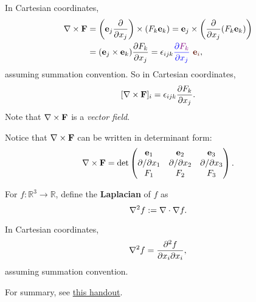 \begin{note}
    In Cartesian coordinates, 
    \begin{align*}
        \curl \bfF&= \left( \mathbf{e}_j \frac{\partial }{\partial x_j} \right)\times (F_k\bfe_k)=\bfe_j \times \left( \frac{\partial }{\partial x_j}(F_k\bfe_k)  \right)\\ 
        &= (\mathbf{e}_j \times \mathbf{e}_k)\frac{\partial F_k}{\partial x_j} = \epsilon_{ijk} {\color{blue}\frac{\partial {\color{violet}F_k}}{\partial x_j}} \ {\color{Sepia}\bfe_i},
    \end{align*}
    assuming summation convention. So in Cartesian coordinates,
    \[
        [\nabla\times {\bf F}]_{i} = \epsilon_{ijk}\frac{\partial F_k}{\partial x_j}. 
    \]
    Note that $ \nabla\times {\bf F} $ is a \textit{vector field}.
\end{note}
Notice that $ \nabla\times {\bf F} $ can be written in determinant form:
\[
    \nabla\times {\bf F} = \det \begin{pmatrix}
        {\bf e}_1 & {\bf e}_2 & {\bf e}_3 \\
        \partial /\partial x_1  & \partial /\partial x_2  & \partial /\partial x_3  \\
        F_1 & F_2 & F_3 \\
    \end{pmatrix}.
\]

\begin{definition}[Laplacian]
    For $ f:\mathbb{R}^{3}\to \mathbb{R} $, define the \textbf{Laplacian} of $f$ as 
    \[
        \laplacian f:= \div \nabla f.
    \]
\end{definition}
\begin{note}
    In Cartesian coordinates, 
    \[
        \laplacian f = \frac{\partial ^2 f}{\partial x_i \partial x_i}, 
    \]
    assuming summation convention.
\end{note}

For summary, see \href{http://jt775.user.srcf.net/IA-Lent/handouts/vc_handout3.pdf}{this handout}.

